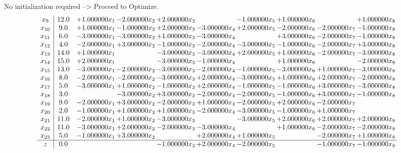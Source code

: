 \documentclass[10pt]{article}
\begin{document}
No initialization required --> Proceed to Optimize. 
\[\begin{array}{c| c c@{\hskip 2pt} c@{\hskip 2pt} c@{\hskip 2pt} c@{\hskip 2pt} c@{\hskip 2pt} c@{\hskip 2pt} c@{\hskip 2pt} c@{\hskip 2pt} }
 x_{9}   &  12.0 & + 1.000000 x_{1} & -2.000000 x_{2} & + 2.000000 x_{3} &   & -1.000000 x_{5} & + 1.000000 x_{6} &   & + 1.000000 x_{8}\\
 x_{10}   &  9.0 & + 1.000000 x_{1} & -1.000000 x_{2} & + 2.000000 x_{3} & -3.000000 x_{4} & + 2.000000 x_{5} & -2.000000 x_{6} & -2.000000 x_{7} & -1.000000 x_{8}\\
 x_{11}   &  6.0 & -3.000000 x_{1} & -3.000000 x_{2} & + 1.000000 x_{3} & -3.000000 x_{4} &   & + 3.000000 x_{6} & -2.000000 x_{7} & -1.000000 x_{8}\\
 x_{12}   &  4.0 & -2.000000 x_{1} & + 3.000000 x_{2} & -1.000000 x_{3} & -2.000000 x_{4} & -3.000000 x_{5} & -1.000000 x_{6} & -2.000000 x_{7} & + 3.000000 x_{8}\\
 x_{13}   &  14.0 & + 1.000000 x_{1} &   & -3.000000 x_{3} & -3.000000 x_{4} & + 2.000000 x_{5} & + 1.000000 x_{6} & -2.000000 x_{7} & -3.000000 x_{8}\\
 x_{14}   &  15.0 & + 2.000000 x_{1} &   & -3.000000 x_{3} & -1.000000 x_{4} &   & + 1.000000 x_{6} &   & -2.000000 x_{8}\\
 x_{15}   &  13.0 & -3.000000 x_{1} & -2.000000 x_{2} & -3.000000 x_{3} & -2.000000 x_{4} & -1.000000 x_{5} & -3.000000 x_{6} & + 1.000000 x_{7} & -3.000000 x_{8}\\
 x_{16}   &  8.0 & -2.000000 x_{1} & -2.000000 x_{2} & -3.000000 x_{3} & + 2.000000 x_{4} & -3.000000 x_{5} & + 1.000000 x_{6} & + 2.000000 x_{7} & -2.000000 x_{8}\\
 x_{17}   &  5.0 & -3.000000 x_{1} & + 1.000000 x_{2} & -1.000000 x_{3} & + 2.000000 x_{4} & -1.000000 x_{5} & -1.000000 x_{6} & + 3.000000 x_{7} & -3.000000 x_{8}\\
 x_{18}   &  3.0  &   & -3.000000 x_{2} & + 3.000000 x_{3} & -2.000000 x_{4} & -2.000000 x_{5} & -1.000000 x_{6} & + 3.000000 x_{7} & -1.000000 x_{8}\\
 x_{19}   &  9.0 & -2.000000 x_{1} & + 3.000000 x_{2} & -2.000000 x_{3} & + 1.000000 x_{4} & -2.000000 x_{5} & + 2.000000 x_{6} & -2.000000 x_{7} &   \\
 x_{20}   &  2.0 & -1.000000 x_{1} & + 1.000000 x_{2} & + 1.000000 x_{3} & -2.000000 x_{4} & -3.000000 x_{5} & -1.000000 x_{6} & + 1.000000 x_{7} &   \\
 x_{21}   &  11.0 & -2.000000 x_{1} & + 1.000000 x_{2} & -3.000000 x_{3} &   & -3.000000 x_{5} & + 2.000000 x_{6} & + 2.000000 x_{7} & + 2.000000 x_{8}\\
 x_{22}   &  11.0 & -3.000000 x_{1} & + 2.000000 x_{2} & -2.000000 x_{3} & -3.000000 x_{4} &   & + 1.000000 x_{6} & -2.000000 x_{7} & -2.000000 x_{8}\\
 x_{23}   &  5.0 & -1.000000 x_{1} & + 3.000000 x_{2} &   & + 2.000000 x_{4} & + 1.000000 x_{5} &   & -2.000000 x_{7} & + 1.000000 x_{8}\\
\hline
z    &  0.0  &    &   & -1.000000 x_{3} & + 2.000000 x_{4} & -2.000000 x_{5} &   & -1.000000 x_{7} & -1.000000 x_{8}\\
\end{array}\]
\end{document}

